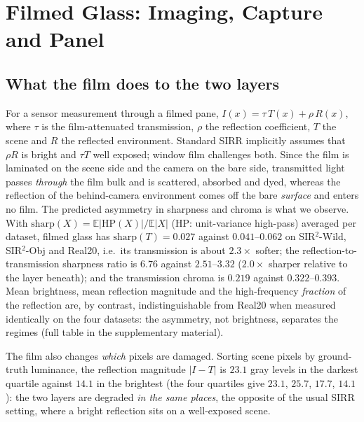 \section{Filmed Glass: Imaging, Capture and Panel}
\label{sec:imaging}

\subsection{What the film does to the two layers}
\label{sec:film}

For a sensor measurement through a filmed pane,
$I(x)=\tau\,T(x)+\rho\,R(x)$, where $\tau$ is the film-attenuated transmission, $\rho$
the reflection coefficient, $T$ the scene and $R$ the reflected environment. Standard
SIRR implicitly assumes that $\rho R$ is bright and $\tau T$ well exposed; window film
challenges both. Since the film is laminated on the scene side and the camera on the
bare side, transmitted light passes \emph{through} the film bulk and is scattered,
absorbed and dyed, whereas the reflection of the behind-camera environment comes off the
bare \emph{surface} and enters no film. The predicted asymmetry in sharpness and chroma
is what we observe. With $\mathrm{sharp}(X)=\mathbb{E}|\mathrm{HP}(X)|/\mathbb{E}|X|$
(HP: unit-variance high-pass) averaged per dataset, filmed glass has
$\mathrm{sharp}(T)=0.027$ against $0.041$--$0.062$ on SIR$^2$-Wild, SIR$^2$-Obj and
Real20, i.e.\ its transmission is about $2.3\times$ softer; the
reflection-to-transmission sharpness ratio is $6.76$ against $2.51$--$3.32$ ($2.0\times$
sharper relative to the layer beneath); and the transmission chroma is $0.219$ against
$0.322$--$0.393$. Mean brightness, mean reflection magnitude and the high-frequency
\emph{fraction} of the reflection are, by contrast, indistinguishable from Real20 when
measured identically on the four datasets: the asymmetry, not brightness, separates the
regimes (full table in the supplementary material).

The film also changes \emph{which} pixels are damaged. Sorting scene pixels by
ground-truth luminance, the reflection magnitude $|I-T|$ is $23.1$ gray levels in the
darkest quartile against $14.1$ in the brightest (the four quartiles give $23.1$, $25.7$,
$17.7$, $14.1$): the two layers are degraded \emph{in the same places}, the opposite of
the usual SIRR setting, where a bright reflection sits on a well-exposed scene.

